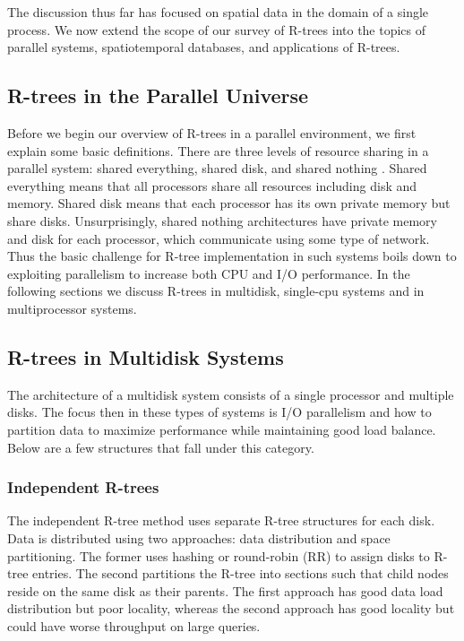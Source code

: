 The discussion thus far has focused on spatial data in the domain of a single
process. We now extend the scope of our survey of R-trees into the topics of
parallel systems, spatiotemporal databases, and applications of R-trees.

\subsection{R-trees in the Parallel Universe}
Before we begin our overview of R-trees in a parallel environment, we first 
explain some basic definitions. There are three levels of resource sharing in
a parallel system: shared everything, shared disk, and shared nothing
\cite{thebook}. Shared everything means that all processors share all 
resources including disk and memory. Shared disk means that each processor 
has its own private memory but share disks. Unsurprisingly, shared nothing 
architectures have private memory and disk for each processor, which
communicate using some type of network. Thus the basic challenge for R-tree 
implementation in such systems boils down to exploiting parallelism to 
increase both CPU and I/O performance. In the following sections we discuss
R-trees in multidisk, single-cpu systems and in multiprocessor systems.

\subsection{R-trees in Multidisk Systems}
The architecture of a multidisk system consists of a single processor and 
multiple disks. The focus then in these types of systems is I/O parallelism
and how to partition data to maximize performance while maintaining good load
balance. Below are a few structures that fall under this category.

\subsubsection{Independent R-trees}
The independent R-tree method \cite{kamel1992parallel}\cite{thebook} uses separate R-tree structures for each disk.
Data is distributed using two approaches: data distribution and space 
partitioning. The former uses hashing or round-robin (RR) to assign disks to
R-tree entries. The second partitions the R-tree into sections such that 
child nodes reside on the same disk as their parents. The first approach 
has good data load distribution but poor locality, whereas the second approach
has good locality but could have worse throughput on large queries.

